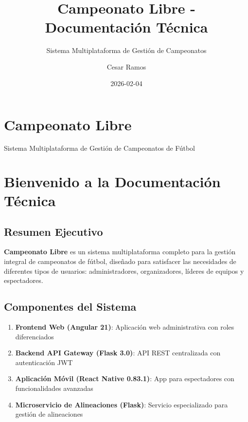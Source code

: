 \documentclass[
  spanish,
  11pt,
  letterpaper,
]{book}
\title{Campeonato Libre - Documentación Técnica}
\subtitle{Sistema Multiplataforma de Gestión de Campeonatos}
\author{Cesar Ramos}
\date{2026-02-04}
\providecommand{\tightlist}{%
  \setlength{\itemsep}{0pt}\setlength{\parskip}{0pt}}
\begin{document}
\frontmatter
\maketitle


\mainmatter
{}

\chapter{Campeonato Libre}\label{campeonato-libre}

Sistema Multiplataforma de Gestión de Campeonatos de Fútbol

\hfill\break


\chapter{Bienvenido a la Documentación
Técnica}\label{bienvenido-a-la-documentaciuxf3n-tuxe9cnica}

\section{Resumen Ejecutivo}\label{resumen-ejecutivo}

\textbf{Campeonato Libre} es un sistema multiplataforma completo para la
gestión integral de campeonatos de fútbol, diseñado para satisfacer las
necesidades de diferentes tipos de usuarios: administradores,
organizadores, líderes de equipos y espectadores.

\section{Componentes del Sistema}\label{componentes-del-sistema}

\begin{enumerate}
\def\labelenumi{\arabic{enumi}.}
\tightlist
\item
  \textbf{Frontend Web (Angular 21)}: Aplicación web administrativa con
  roles diferenciados
\item
  \textbf{Backend API Gateway (Flask 3.0)}: API REST centralizada con
  autenticación JWT
\item
  \textbf{Aplicación Móvil (React Native 0.83.1)}: App para espectadores
  con funcionalidades avanzadas
\item
  \textbf{Microservicio de Alineaciones (Flask)}: Servicio especializado
  para gestión de alineaciones
\end{enumerate}
\end{document}
